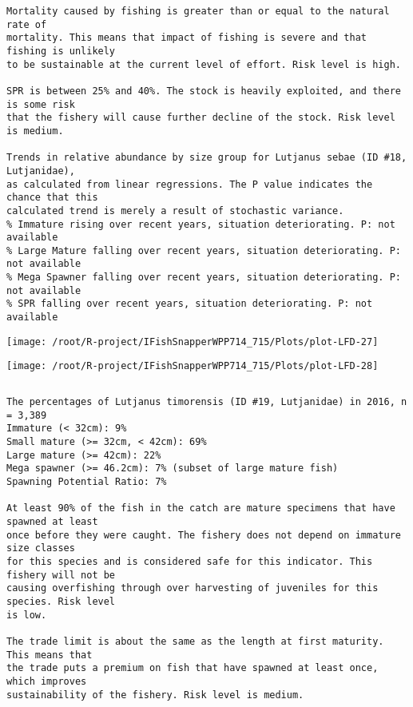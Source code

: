 \documentclass{report}\usepackage[]{graphicx}\usepackage[]{color}
\makeatletter
\def\maxwidth{ %
  \ifdim\Gin@nat@width>\linewidth
    \linewidth
  \else
    \Gin@nat@width
  \fi
}
\newenvironment{kframe}{%
 \def\at@end@of@kframe{}%
 \ifinner\ifhmode%
  \def\at@end@of@kframe{\end{minipage}}%
  \begin{minipage}{\columnwidth}%
 \fi\fi%
 \def\FrameCommand##1{\hskip\@totalleftmargin \hskip-\fboxsep
 \colorbox{shadecolor}{##1}\hskip-\fboxsep
     \hskip-\linewidth \hskip-\@totalleftmargin \hskip\columnwidth}%
 \MakeFramed {\advance\hsize-\width
   \@totalleftmargin\z@ \linewidth\hsize
   \@setminipage}}%
 {\par\unskip\endMakeFramed%
 \at@end@of@kframe}
\newenvironment{knitrout}{}{} %
\makeatother
\begin{document}
\begin{knitrout}
\begin{kframe}
\begin{verbatim}
Mortality caused by fishing is greater than or equal to the natural rate of
mortality. This means that impact of fishing is severe and that fishing is unlikely
to be sustainable at the current level of effort. Risk level is high.
 
SPR is between 25% and 40%. The stock is heavily exploited, and there is some risk
that the fishery will cause further decline of the stock. Risk level is medium.
 
Trends in relative abundance by size group for Lutjanus sebae (ID #18, Lutjanidae),
as calculated from linear regressions. The P value indicates the chance that this
calculated trend is merely a result of stochastic variance.
% Immature rising over recent years, situation deteriorating. P: not available
% Large Mature falling over recent years, situation deteriorating. P: not available
% Mega Spawner falling over recent years, situation deteriorating. P: not available
% SPR falling over recent years, situation deteriorating. P: not available
\end{verbatim}
\end{kframe}
\texttt{[image: /root/R-project/IFishSnapperWPP714\_715/Plots/plot-LFD-27]} 

\texttt{[image: /root/R-project/IFishSnapperWPP714\_715/Plots/plot-LFD-28]} 
\begin{kframe}\begin{verbatim}
\end{verbatim}
\end{kframe}
\clearpage
\newpage
\begin{kframe}\begin{verbatim}The percentages of Lutjanus timorensis (ID #19, Lutjanidae) in 2016, n = 3,389
Immature (< 32cm): 9%
Small mature (>= 32cm, < 42cm): 69%
Large mature (>= 42cm): 22%
Mega spawner (>= 46.2cm): 7% (subset of large mature fish)
Spawning Potential Ratio: 7%
 
At least 90% of the fish in the catch are mature specimens that have spawned at least
once before they were caught. The fishery does not depend on immature size classes
for this species and is considered safe for this indicator. This fishery will not be
causing overfishing through over harvesting of juveniles for this species. Risk level
is low.

The trade limit is about the same as the length at first maturity.  This means that
the trade puts a premium on fish that have spawned at least once, which improves
sustainability of the fishery. Risk level is medium.


\end{verbatim}
\end{kframe}
\end{knitrout}
\end{document}
